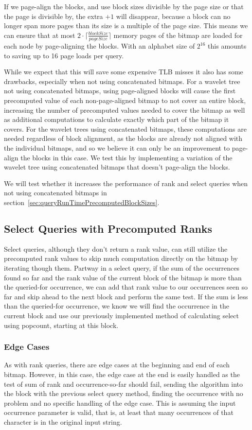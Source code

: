 If we page-align the blocks, and use block sizes divisible by the page size or that the page is divisible by, the extra $+1$ will disappear, because a block can no longer span more pages than its size is a multiple of the page size.
This means we can ensure that at most $2 \cdot \lceil\frac{blockSize}{pageSize}\rceil$ memory pages of the bitmap are loaded for each node by page-aligning the blocks.
With an alphabet size of $2^{16}$ this amounts to saving up to 16 page loads per query.

While we expect that this will save some expensive TLB misses it also has some drawbacks, especially when not using concatenated bitmaps.
For a wavelet tree not using concatenated bitmaps, using page-aligned blocks will cause the first precomputed value of each non-page-aligned bitmap to not cover an entire block, increasing the number of precomputed values needed to cover the bitmap as well as additional computations to calculate exactly which part of the bitmap it covers.
For the wavelet trees using concatenated bitmaps, these computations are needed regardless of block alignment, as the blocks are already not aligned with the individual bitmaps, and so we believe it can only be an improvement to page-align the blocks in this case.
We test this by implementing a variation of the wavelet tree using concatenated bitmaps that doesn't page-align the blocks.

We will test whether it increases the performance of rank and select queries when not using concatenated bitmaps in section~\ref{sec:queryRunTimePrecomputedBlockSizes}.


\subsection{Select Queries with Precomputed Ranks}
Select queries, although they don't return a rank value, can still utilize the precomputed rank values to skip much computation directly on the bitmap by iterating though them.
Partway in a select query, if the sum of the occurrences found so far and the rank value of the current block of the bitmap is more than the queried-for occurrence, we can add that rank value to our occurrences seen so far and skip ahead to the next block and perform the same test.
If the sum is less than the queried-for occurrence, we know we will find the occurrence in the current block and use our previously implemented method of calculating select using popcount, starting at this block.


\subsubsection{Edge Cases}
As with rank queries, there are edge cases at the beginning and end of each bitmap.
However, in this case, the edge case at the end is easily handled as the test of sum of rank and occurrence-so-far should fail, sending the algorithm into the block with the previous select query method, finding the occurrence with no problem and no specific handling of the edge case.
This is assuming the input occurrence parameter is valid, that is, at least that many occurrences of that character is in the original input string.

